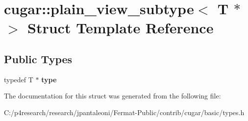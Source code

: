 \hypertarget{structcugar_1_1plain__view__subtype_3_01_t_01_5_01_4}{}\section{cugar\+:\+:plain\+\_\+view\+\_\+subtype$<$ T $\ast$ $>$ Struct Template Reference}
\label{structcugar_1_1plain__view__subtype_3_01_t_01_5_01_4}
\subsection*{Public Types}
\begin{DoxyCompactItemize}
\item 
\mbox{\label{structcugar_1_1plain__view__subtype_3_01_t_01_5_01_4_adce52c36f033bb1f1e66f588a1645105}} 
typedef T $\ast$ {\bfseries type}
\end{DoxyCompactItemize}


The documentation for this struct was generated from the following file\+:\begin{DoxyCompactItemize}
\item 
C\+:/p4research/research/jpantaleoni/\+Fermat-\/\+Public/contrib/cugar/basic/types.\+h\end{DoxyCompactItemize}
